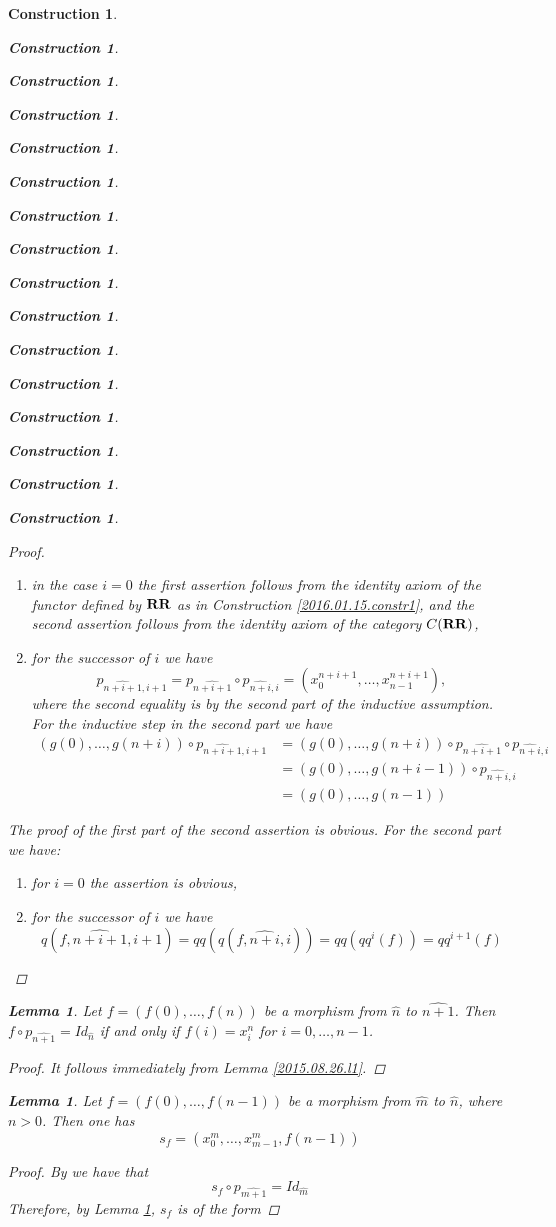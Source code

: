 \documentclass[12pt]{amsart}
\newtheorem{lemma}[proposition]{Lemma}
\numberwithin{proposition}{subsection}
\newtheorem{construction}[proposition]{Construction}
\newcommand{\llabel}[1]{\label{#1}}
\newcommand{\wh}{\widehat}
\newcommand{\RR}{{\bf RR}}
\begin{document}
\begin{construction}
\begin{construction}
\begin{construction}
\begin{construction}
\begin{construction}
\begin{construction}
\begin{construction}
\begin{construction}
\begin{construction}
\begin{construction}
\begin{construction}
\begin{construction}
\begin{construction}
\begin{construction}
\begin{construction}
\begin{construction}
\begin{proof}
%
\begin{enumerate}
\item in the case $i=0$ the first assertion follows from the identity axiom of
  the functor defined by $\RR$ as in Construction \ref{2016.01.15.constr1}, and
  the second assertion follows from the identity axiom of the category $C(\RR)$,
\item for the successor of $i$ we have
%
$$p_{\wh{n+i+1},i+1}=p_{\wh{n+i+1}}\circ p_{\wh{n+i},i}=(x_0^{n+i+1},\dots,x_{n-1}^{n+i+1}),$$
%
where the second equality is by the second part of the inductive
assumption. For the inductive step in the second part we have
%
\begin{equation*}
  \begin{split}
    (g(0),\dots,g(n+i))\circ p_{\wh{n+i+1},i+1}&=(g(0),\dots,g(n+i))\circ p_{\wh{n+i+1}}\circ p_{\wh{n+i},i}
    \\&=
    (g(0),\dots,g(n+i-1))\circ p_{\wh{n+i},i}
    \\&=
    (g(0),\dots,g(n-1))
  \end{split}
\end{equation*}
%
\end{enumerate}
%
The proof of the first part of the second assertion is obvious. For the second
part we have:
%
\begin{enumerate}
\item for $i=0$ the assertion is obvious,
\item for the successor of $i$ we have 
%
$$q(f,\wh{n+i+1},i+1)=qq(q(f,\wh{n+i},i))=qq(qq^i(f))=qq^{i+1}(f)$$
%
\end{enumerate}
%
\end{proof}
%
\begin{lemma}
\llabel{2015.08.22.l7}
Let $f=(f(0),\dots,f(n))$ be a morphism from $\wh{n}$ to $\wh{n+1}$. Then
$f\circ p_{\wh{n+1}}=Id_{\wh{n}}$ if and only if $f(i)=x_i^{n}$ for
$i=0,\dots,n-1$.
\end{lemma}
%
\begin{proof}
It follows immediately from Lemma \ref{2015.08.26.l1}.
\end{proof}
%
\begin{lemma}
\llabel{2015.09.09.l1}
Let $f=(f(0),\dots,f(n-1))$ be a morphism from $\wh{m}$ to $\wh{n}$, where $n>0$. Then one has
%
$$s_f=(x_0^{m},\dots,x_{m-1}^{m},f(n-1))$$
%
\end{lemma}
%
\begin{proof}
By \cite[Definition 2.3(2)]{Csubsystems} we have that 
%
$$s_f\circ p_{\wh{m+1}}=Id_{\wh{m}}$$
%
Therefore, by Lemma \ref{2015.08.22.l7}, $s_f$ is of the form

\end{proof}
\end{construction}
\end{construction}
\end{construction}
\end{construction}
\end{construction}
\end{construction}
\end{construction}
\end{construction}
\end{construction}
\end{construction}
\end{construction}
\end{construction}
\end{construction}
\end{construction}
\end{construction}
\end{construction}
\end{document}
